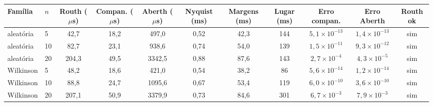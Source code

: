 \begin{tabular}{llccccccccc}
\hline
Família & $n$ & Routh ($\mu$s) & Compan. ($\mu$s) & Aberth ($\mu$s) & Nyquist (ms) & Margens (ms) & Lugar (ms) & Erro compan. & Erro Aberth & Routh ok \\
\hline
aleatória & 5 & 42{,}7 & 18{,}2 & 497{,}0 & 0{,}52 & 42{,}3 & 144 & $5{,}1 \times 10^{-13}$ & $1{,}4 \times 10^{-13}$ & sim \\
aleatória & 10 & 82{,}7 & 23{,}1 & 938{,}6 & 0{,}74 & 54{,}0 & 139 & $1{,}5 \times 10^{-11}$ & $9{,}3 \times 10^{-12}$ & sim \\
aleatória & 20 & 204{,}3 & 49{,}5 & 3342{,}5 & 0{,}88 & 87{,}6 & 143 & $2{,}7 \times 10^{-4}$ & $4{,}3 \times 10^{-5}$ & sim \\
Wilkinson & 5 & 48{,}2 & 18{,}6 & 421{,}0 & 0{,}54 & 38{,}2 & 86 & $5{,}6 \times 10^{-14}$ & $1{,}2 \times 10^{-14}$ & sim \\
Wilkinson & 10 & 88{,}8 & 24{,}7 & 1095{,}6 & 0{,}67 & 53{,}4 & 119 & $6{,}0 \times 10^{-10}$ & $3{,}6 \times 10^{-10}$ & sim \\
Wilkinson & 20 & 207{,}1 & 50{,}9 & 3379{,}9 & 0{,}73 & 84{,}6 & 301 & $6{,}7 \times 10^{-3}$ & $7{,}9 \times 10^{-3}$ & sim \\
\hline
\end{tabular}
